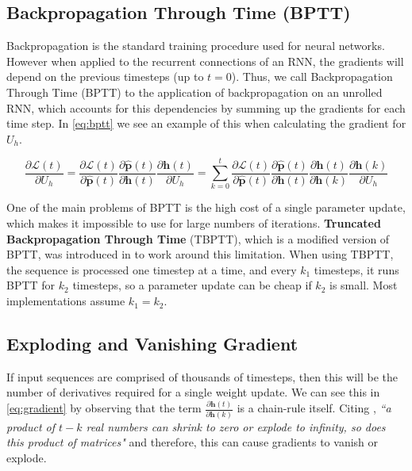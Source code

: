 \subsection{Backpropagation Through Time (BPTT)}

Backpropagation is the standard training procedure used for neural networks. However when applied to the recurrent connections of an RNN, the gradients will depend on the previous timesteps (up to $t=0$). Thus, we call Backpropagation Through Time (BPTT) to the application of backpropagation on an unrolled RNN, which accounts for this dependencies by summing up the gradients for each time step. In \autoref{eq:bptt} we see an example of this when calculating the gradient for $U_h$.

\begin{equation} \label{eq:bptt}
\frac{\partial \mathcal{L}(t)}{\partial U_h} = \frac{\partial \mathcal{L}(t)}{\partial \mathbf{\hat{p}}(t)}\frac{\partial \mathbf{\hat{p}}(t)}{\partial \mathbf{h}(t)}\frac{\partial \mathbf{h}(t)}{\partial U_h} = \sum_{k=0}^{t} \frac{\partial \mathcal{L}(t)}{\partial \mathbf{\hat{p}}(t)}\frac{\partial \mathbf{\hat{p}}(t)}{\partial \mathbf{h}(t)}\frac{\partial \mathbf{h}(t)}{\partial \mathbf{h}(k)}\frac{\partial \mathbf{h}(k)}{\partial U_h}
\end{equation}

One of the main problems of BPTT is the high cost of a single parameter update, which makes it impossible to use for large numbers of iterations. \textbf{Truncated Backpropagation Through Time} (TBPTT), which is a modified version of BPTT, was introduced in \cite{sutskever2013training} to work around this limitation. When using TBPTT, the sequence is processed one timestep at a time, and every $k_1$ timesteps, it runs BPTT for $k_2$ timesteps, so a parameter update can be cheap if $k_2$ is small. Most implementations assume $k_1=k_2$.

\subsection{Exploding and Vanishing Gradient}

If input sequences are comprised of thousands of timesteps, then this will be the number of derivatives required for a single weight update. We can see this in \autoref{eq:gradient} by observing that the term $\frac{\partial \mathbf{h}(t)}{\partial \mathbf{h}(k)}$ is a chain-rule itself. Citing \cite{pascanu2013difficulty}, \textit{``a product of $t-k$ real numbers can shrink to zero or explode to infinity, so does this product of matrices"} and therefore, this can cause gradients to vanish or explode. 

